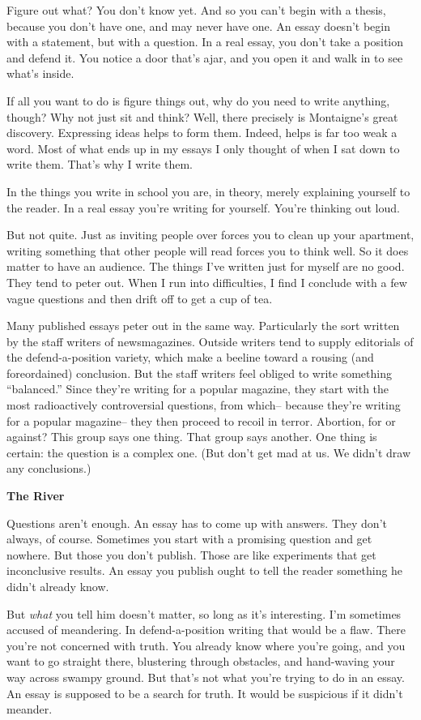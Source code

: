 Figure out what? You don't know yet. And so you can't begin with a
thesis, because you don't have one, and may never have one. An essay
doesn't begin with a statement, but with a question. In a real essay,
you don't take a position and defend it. You notice a door that's ajar,
and you open it and walk in to see what's inside.

If all you want to do is figure things out, why do you need to write
anything, though? Why not just sit and think? Well, there precisely is
Montaigne's great discovery. Expressing ideas helps to form them.
Indeed, helps is far too weak a word. Most of what ends up in my essays
I only thought of when I sat down to write them. That's why I write
them.

In the things you write in school you are, in theory, merely explaining
yourself to the reader. In a real essay you're writing for yourself.
You're thinking out loud.

But not quite. Just as inviting people over forces you to clean up your
apartment, writing something that other people will read forces you to
think well. So it does matter to have an audience. The things I've
written just for myself are no good. They tend to peter out. When I run
into difficulties, I find I conclude with a few vague questions and then
drift off to get a cup of tea.

Many published essays peter out in the same way. Particularly the sort
written by the staff writers of newsmagazines. Outside writers tend to
supply editorials of the defend-a-position variety, which make a beeline
toward a rousing (and foreordained) conclusion. But the staff writers
feel obliged to write something ``balanced.'' Since they're writing for
a popular magazine, they start with the most radioactively controversial
questions, from which-- because they're writing for a popular magazine--
they then proceed to recoil in terror. Abortion, for or against? This
group says one thing. That group says another. One thing is certain: the
question is a complex one. (But don't get mad at us. We didn't draw any
conclusions.)

\textbf{The River}

Questions aren't enough. An essay has to come up with answers. They
don't always, of course. Sometimes you start with a promising question
and get nowhere. But those you don't publish. Those are like experiments
that get inconclusive results. An essay you publish ought to tell the
reader something he didn't already know.

But \emph{what} you tell him doesn't matter, so long as it's
interesting. I'm sometimes accused of meandering. In defend-a-position
writing that would be a flaw. There you're not concerned with truth. You
already know where you're going, and you want to go straight there,
blustering through obstacles, and hand-waving your way across swampy
ground. But that's not what you're trying to do in an essay. An essay is
supposed to be a search for truth. It would be suspicious if it didn't
meander.

